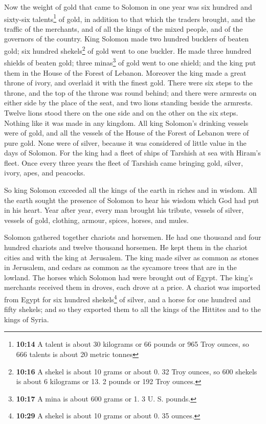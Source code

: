  Now the weight of gold that came to Solomon in one year
was six hundred and sixty-six talents\footnote{\textbf{10:14} A talent
  is about 30 kilograms or 66 pounds or 965 Troy ounces, so 666 talents
  is about 20 metric tonnes} of gold,  in addition to
that which the traders brought, and the traffic of the merchants, and of
all the kings of the mixed people, and of the governors of the country.
 King Solomon made two hundred bucklers of beaten gold;
six hundred shekels\footnote{\textbf{10:16} A shekel is about 10 grams
  or about 0. 32 Troy ounces, so 600 shekels is about 6 kilograms or 13.
  2 pounds or 192 Troy ounces.} of gold went to one buckler.
 He made three hundred shields of beaten gold; three
minas\footnote{\textbf{10:17} A mina is about 600 grams or 1. 3 U. S.
  pounds.} of gold went to one shield; and the king put them in the
House of the Forest of Lebanon.  Moreover the king made a
great throne of ivory, and overlaid it with the finest gold.
 There were six steps to the throne, and the top of the
throne was round behind; and there were armrests on either side by the
place of the seat, and two lions standing beside the armrests.
 Twelve lions stood there on the one side and on the
other on the six steps. Nothing like it was made in any kingdom.
 All king Solomon's drinking vessels were of gold, and
all the vessels of the House of the Forest of Lebanon were of pure gold.
None were of silver, because it was considered of little value in the
days of Solomon.  For the king had a fleet of ships of
Tarshish at sea with Hiram's fleet. Once every three years the fleet of
Tarshish came bringing gold, silver, ivory, apes, and peacocks.

 So king Solomon exceeded all the kings of the earth in
riches and in wisdom.  All the earth sought the presence
of Solomon to hear his wisdom which God had put in his heart.
 Year after year, every man brought his tribute, vessels
of silver, vessels of gold, clothing, armour, spices, horses, and mules.

 Solomon gathered together chariots and horsemen. He had
one thousand and four hundred chariots and twelve thousand horsemen. He
kept them in the chariot cities and with the king at Jerusalem.
 The king made silver as common as stones in Jerusalem,
and cedars as common as the sycamore trees that are in the lowland.
 The horses which Solomon had were brought out of Egypt.
The king's merchants received them in droves, each drove at a price.
 A chariot was imported from Egypt for six hundred
shekels\footnote{\textbf{10:29} A shekel is about 10 grams or about 0.
  35 ounces.} of silver, and a horse for one hundred and fifty shekels;
and so they exported them to all the kings of the Hittites and to the
kings of Syria.

